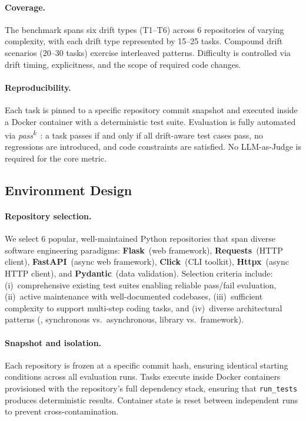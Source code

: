 \paragraph{Coverage.}
The benchmark spans six drift types (T1--T6) across 6 repositories of varying complexity, with each drift type represented by 15--25 tasks. Compound drift scenarios (20--30 tasks) exercise interleaved patterns. Difficulty is controlled via drift timing, explicitness, and the scope of required code changes.

\paragraph{Reproducibility.}
Each task is pinned to a specific repository commit snapshot and executed inside a Docker container with a deterministic test suite. Evaluation is fully automated via \emph{pass\textsuperscript{k}}~\citep{yao2024taubench}: a task passes if and only if all drift-aware test cases pass, no regressions are introduced, and code constraints are satisfied. No LLM-as-Judge is required for the core metric.

\subsection{Environment Design}
\label{sec:bench-env}

\paragraph{Repository selection.}
We select 6 popular, well-maintained Python repositories that span diverse software engineering paradigms: \textbf{Flask}~(web framework), \textbf{Requests}~(HTTP client), \textbf{FastAPI}~(async web framework), \textbf{Click}~(CLI toolkit), \textbf{Httpx}~(async HTTP client), and \textbf{Pydantic}~(data validation). Selection criteria include: (i)~comprehensive existing test suites enabling reliable pass/fail evaluation, (ii)~active maintenance with well-documented codebases, (iii)~sufficient complexity to support multi-step coding tasks, and (iv)~diverse architectural patterns (\eg, synchronous vs.\ asynchronous, library vs.\ framework).

\paragraph{Snapshot and isolation.}
Each repository is frozen at a specific commit hash, ensuring identical starting conditions across all evaluation runs. Tasks execute inside Docker containers provisioned with the repository's full dependency stack, ensuring that \texttt{run\_tests} produces deterministic results. Container state is reset between independent runs to prevent cross-contamination.

